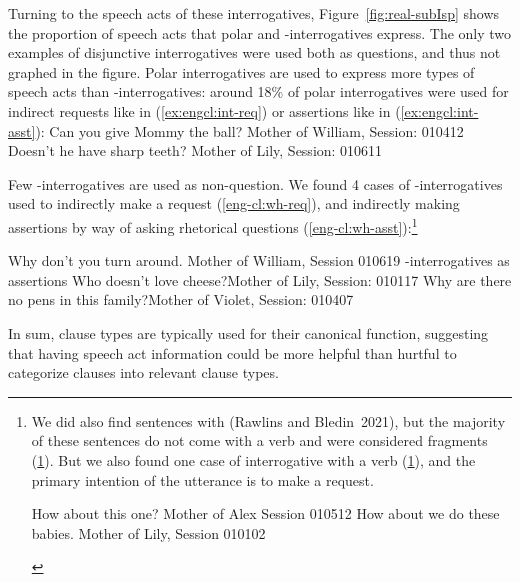 Turning to the speech acts of these interrogatives, Figure~\ref{fig:real-subIsp} shows the proportion of speech acts that polar and \twh-interrogatives express. The only two examples of disjunctive interrogatives were used both as questions, and thus not graphed in the figure. Polar interrogatives are used to express more types of speech acts than \twh-interrogatives: around 18\% of polar interrogatives were used for indirect requests like in (\ref{ex:engcl:int-req}) or assertions like in (\ref{ex:engcl:int-asst}):
Can you give Mommy the ball? \hfill Mother of William, Session: 010412
\eex
{}
Doesn’t he have sharp teeth?	\hfill	Mother of Lily, Session: 010611
\eex

Few \twh-interrogatives are used as non-question. We found 4 cases of \twh-interrogatives used to indirectly make a request (\ref{eng-cl:wh-req}), and indirectly making assertions by way of asking rhetorical questions (\ref{eng-cl:wh-asst}):\footnote{We did also find sentences with  (Rawlins and Bledin~2021), but the majority of these sentences do not come with a verb and were considered fragments (\ref{eng-cl:howabout-frag}). But we also found one case of  interrogative with a verb (\ref{eng-cl:howabout-int}), and the primary intention of the utterance is to make a request. 

\begin{xlisti}
\ex \label{eng-cl:howabout-frag} How about this one?	\hfill	Mother of Alex Session 010512
\ex \label{eng-cl:howabout-int} How about we do these babies. \hfill	Mother of Lily, Session 010102
\end{xlisti}
}


Why don’t you turn around.	\hfill Mother of William, Session 010619
\eex
{}
\twh-interrogatives as assertions
\bxl{}
Who doesn’t love cheese?\hfill	Mother of Lily, Session: 010117
\ex Why are there no pens in this family?\hfill	Mother of Violet, Session: 010407
\exl
\eex


In sum, clause types are typically used for their canonical function, suggesting that having speech act information could be more helpful than hurtful to categorize clauses into relevant clause types.

